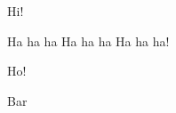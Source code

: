\documentclass{sp-exam}
\date{12. März 2024}
\begin{document}
   \maketitle

   \makeatletter
   \begin{Exercise}{Hi!}
   \end{Exercise}

   \begin{Exercise}[5]{Ha ha ha Ha ha ha Ha ha ha!}
   \end{Exercise}

   \begin{Exercise}{Ho!}
   \end{Exercise}
   \appendix
   Bar
\end{document}
